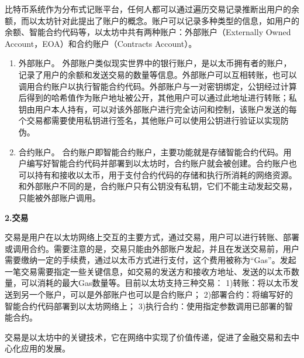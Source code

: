     
比特币系统作为分布式记账平台，任何人都可以通过遍历交易记录推断出用户的余额，而以太坊针对此提出了账户的概念。账户可以记录多种类型的信息，如用户的余额、智能合约代码等，以太坊中共有两种账户：外部账户（Externally Owned Account，EOA）和合约账户（Contracts Account）。
\begin{enumerate}[label=(\arabic*)]
    \item 外部账户。
    外部账户类似现实世界中的银行账户，是以太币拥有者的账户，记录了用户的余额和发送交易的数量等信息。外部账户可以互相转账，也可以调用合约账户以执行智能合约代码。外部账户与一对密钥绑定，公钥经过计算后得到的哈希值作为账户地址被公开，其他用户可以通过此地址进行转账；私钥由用户本人持有，可以对该外部账户进行完全访问和控制，该账户发送的每个交易都需要使用私钥进行签名，其他账户可以使用公钥进行验证以实现防伪。
    \item 合约账户。
    合约账户即智能合约账户，主要功能就是存储智能合约代码。用户编写好智能合约代码并部署到以太坊时，合约账户就会被创建。合约账户也可以持有和接收以太币，用于支付合约代码的存储和执行所消耗的网络资源。和外部账户不同的是，合约账户只有公钥没有私钥，它们不能主动发起交易，只能被外部账户调用。
    
\end{enumerate}
\par\textbf{2.交易}
    
交易是用户在以太坊网络上交互的主要方式，通过交易，用户可以进行转账、部署或调用合约。需要注意的是，交易只能由外部账户发起，并且在发送交易前，用户需要缴纳一定的手续费，通过以太币方式进行支付，这个费用被称为“Gas”。发起一笔交易需要指定一些关键信息，如交易的发送方和接收方地址、发送的以太币数量，可以消耗的最大Gas数量等。目前以太坊支持三种交易：
1)转账：将以太币发送到另一个账户，可以是外部账户也可以是合约账户；
2)部署合约：将编写好的智能合约代码部署到以太坊网络上；
3)执行合约：使用指定参数调用已部署的智能合约。

交易是以太坊中的关键技术，它在网络中实现了价值传递，促进了金融交易和去中心化应用的发展。
    
